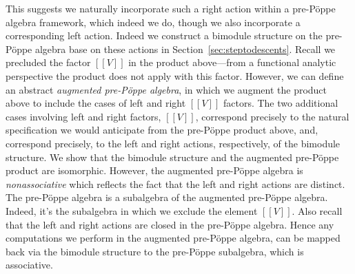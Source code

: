 \documentclass[5p,twocolumn]{elsarticle}
\newcommand*{\lb}{[\![}
\newcommand*{\rb}{]\!]}
\begin{document}
This suggests we naturally incorporate such a right action within a pre-P\"oppe algebra framework, which indeed we do, though we also incorporate a corresponding left action.
Indeed we construct a bimodule structure on the pre-P\"oppe algebra base on these actions in Section~\ref{sec:steptodescents}.
Recall we precluded the factor $\lb V\rb$ in the product above---from a functional analytic perspective the product does not apply with this factor.
However, we can define an abstract \emph{augmented pre-P\"oppe algebra}, in which we augment the product above to include the cases of left and right $\lb V\rb$ factors.
The two additional cases involving left and right factors, $\lb V\rb$, correspond precisely to the natural specification we would anticipate from the pre-P\"oppe product above,
and, correspond precisely, to the left and right actions, respectively, of the bimodule structure.
We show that the bimodule structure and the augmented pre-P\"oppe product are isomorphic.
However, the augmented pre-P\"oppe algebra is \emph{nonassociative} which reflects the fact that the left and right actions are distinct.
The pre-P\"oppe algebra is a subalgebra of the augmented pre-P\"oppe algebra.
Indeed, it's the subalgebra in which we exclude the element $\lb V\rb$.
Also recall that the left and right actions are closed in the pre-P\"oppe algebra.
Hence any computations we perform in the augmented pre-P\"oppe algebra, can be mapped back via the bimodule structure to the pre-P\"oppe subalgebra, which is associative.  
\end{document}

